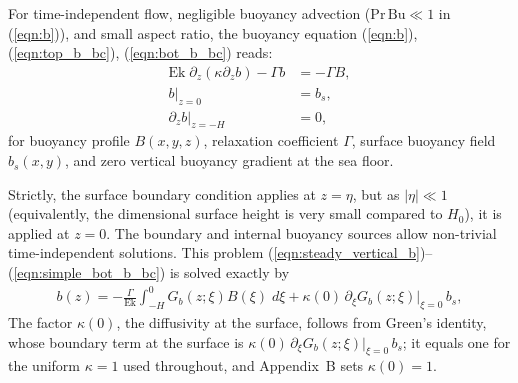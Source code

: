 \documentclass{ametsocV6.2}
\newif\ifshowfootnotes
\newcommand{\myfootnote}[1]{%
  \ifshowfootnotes
    \footnote{#1}%
  \fi
}
\begin{document}
For time-independent flow, negligible buoyancy advection ($\mathrm{Pr}\,\mathrm{Bu} \ll 1$ in (\ref{eqn:b})), and small aspect ratio, the buoyancy equation (\ref{eqn:b}), (\ref{eqn:top_b_bc}), (\ref{eqn:bot_b_bc}) reads:
\begin{align}
\mathrm{Ek} \; \partial_z \left( \kappa \partial_ z b \right) - \Gamma b & = - \Gamma B , \label{eqn:steady_vertical_b} \\
b|_{z = 0} & = b_s , \\
\partial_z b|_{z = -H} &= 0 , \label{eqn:simple_bot_b_bc}
\end{align}
for buoyancy profile $B(x,y,z)$, relaxation coefficient $\Gamma $, surface buoyancy field $b_s(x,y)$, and zero vertical buoyancy gradient at the sea floor.\myfootnote{The more accurate bottom boundary condition on buoyancy, Eq.~(\ref{eqn:bot_b_bc}), includes terms like $\partial_x b \, \partial_x H$, which are proportional to the aspect ratio $\delta$ squared. They couple the vertical buoyancy variations to the horizontal buoyancy variations. As $\delta \approx 10^{-3} \ll 1$ these effects are small, as assumed in Section \ref{sect:equations}\ref{sect:non-dimensionalization}. Still, if necessary (for example in the presence of steep topography), they can be handled in what follows using a Steklov-Poincar\'{e} operator \citep{quarteroni&valli23} or a perturbative approach.
} 
Strictly, the surface boundary condition applies at $z = \eta$, but as $|\eta| \ll 1$ (equivalently, the dimensional surface height is very small compared to $H_0$), it is applied at $z = 0$.
The boundary and internal buoyancy sources allow non-trivial time-independent solutions.
This problem (\ref{eqn:steady_vertical_b})--(\ref{eqn:simple_bot_b_bc}) is solved exactly by
\begin{align}
b(z) = - \frac{\Gamma}{\mathrm{Ek}}  \int_{-H}^{0} G_b(z; \xi) B(\xi) \; d \xi  + \kappa(0) \, \partial_\xi G_b(z;\xi)|_{\xi = 0} \, b_s ,
\label{eqn:b_solution}
\end{align}
The factor $\kappa(0)$, the diffusivity at the surface, follows from Green's identity, whose boundary term at the surface is $\kappa(0) \, \partial_\xi G_b(z;\xi)|_{\xi=0} \, b_s$; it equals one for the uniform $\kappa = 1$ used throughout, and Appendix~B sets $\kappa(0) = 1$.
\end{document}

